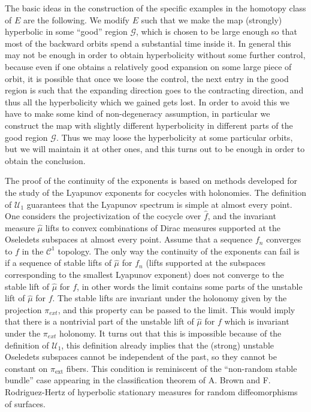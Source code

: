 \documentclass[11pt,letterpaper,reqno]{article}
\newcommand{\pext}{\pi_{\mathrm{ext}}}
\begin{document}
The basic ideas in the construction of the specific examples in the homotopy class of $E$ are the following. We modify $E$ such that we make the map (strongly) hyperbolic in some ``good''  region $\mathcal G$, which is chosen to be large enough so that most of the backward orbits spend a substantial time inside it. In general this may not be enough in order to obtain hyperbolicity without some further control, because even if one obtains a relatively good expansion on some large piece of orbit, it is possible that once we loose the control, the next entry in the good region is such that the expanding direction goes to the contracting direction, and thus all the hyperbolicity which we gained gets lost. In order to avoid this we have to make some kind of non-degeneracy assumption, in particular we construct the map with slightly different hyperbolicity in different parts of the good region $\mathcal G$. Thus we may loose the hyperbolicity at some particular orbits, but we will maintain it at other ones, and this turns out to be enough in order to obtain the conclusion.

The proof of the continuity of the exponents is based on methods developed for the study of the Lyapunov exponents for cocycles with holonomies. The definition of $\mathcal U_1$ guarantees that the Lyapunov spectrum is simple at almost every point. One considers the projectivization of the cocycle over $\hat f$, and the invariant measure $\hat\mu$ lifts to convex combinations of Dirac measures supported at the Oseledets subspaces at almost every point. Assume that a sequence $f_n$ converges to $f$ in the $\mathcal C^1$ topology. The only way the continuity of the exponents can fail is if a sequence of stable lifts of $\hat\mu$ for $f_n$ (lifts supported at the subspaces corresponding to the smallest Lyapunov exponent) does not converge to the stable lift of $\hat\mu$ for $f$, in other words the limit contains some parts of the unstable lift of $\hat\mu$ for $f$. The stable lifts are invariant under the holonomy given by the projection $\pi_{ext}$, and this property can be passed to the limit. This would imply that there is a nontrivial part of the unstable lift of $\hat\mu$ for $f$ which is invariant under the $\pi_{ext}$ holonomy. It turns out that this is impossible because of the definition of $\mathcal U_1$, this definition already implies that the (strong) unstable Oseledets subspaces cannot be independent of the past, so they cannot be constant on $\pext$ fibers. This condition is reminiscent of the ``non-random stable bundle'' case appearing in the classification theorem of A. Brown and F. Rodriguez-Hertz \cite{Brown2017} of hyperbolic stationary measures for random diffeomorphisms of surfaces. 
\end{document}
